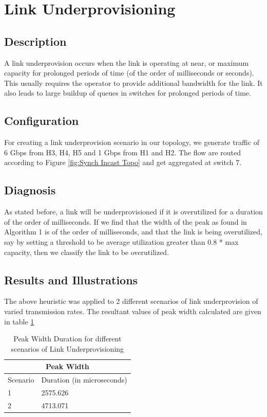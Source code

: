 \section{Link Underprovisioning}
\subsection{Description}
A link underprovision occurs when the link is operating at near, or maximum capacity for prolonged periods of time (of the order of milliseconds or seconds).
This usually requires the operator to provide additional bandwidth for the link.
It also leads to large buildup of queues in switches for prolonged periods of time.
\subsection{Configuration}
For creating a link underprovision scenario in our topology, we generate traffic of 6 Gbps from H3, H4, H5 and 1 Gbps from H1 and H2. The flow are routed
according to Figure \ref{fig:Synch Incast Topo} and get aggregated at switch 7.
\subsection{Diagnosis}
As stated before, a link will be underprovisioned if it is overutilized for a duration of the order of milliseconds.
If we find that the width of the peak as found in Algorithm 1 is of the order of milliseconds, and that the link is being overutilized, say by setting a threshold
to be average utilization greater than 0.8 * max capacity, then we classify the link to be overutilized.
\subsection{Results and Illustrations}
The above heuristic was applied to 2 different scenarios of link underprovision of varied transmission rates.
The resultant values of peak width calculated are given in table \ref{tab:Peak_Width}
\begin{table}[h]
\begin{center}
\begin{tabular}{ |p{3cm}|p{5cm}|  }
	\hline
	\multicolumn{2}{|c|}{Peak Width} \\
	\hline
	Scenario & Duration (in microseconds) \\
	\hline
	1 & 2575.626 \\
	2 & 4713.071 \\
	\hline
   \end{tabular}
\end{center}

\caption{Peak Width Duration for different scenarios of Link Underprovisioning}
\label{tab:Peak_Width}
\end{table}

